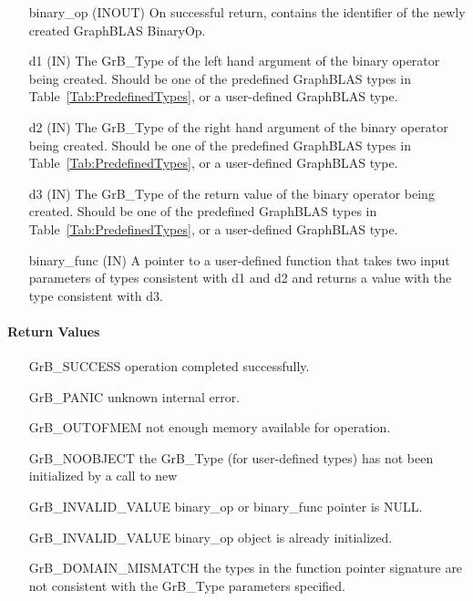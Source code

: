\begin{itemize}[leftmargin=1.1in]
    \item[{\sf binary\_op}] ({\sf INOUT}) On successful return, contains the 
          identifier of the newly created GraphBLAS BinaryOp.
    \item[{\sf d1}]  ({\sf IN}) The {\sf GrB\_Type} of the left hand 
          argument of the binary operator being created. Should be one of the
          predefined GraphBLAS types in Table~\ref{Tab:PredefinedTypes}, or a
          user-defined GraphBLAS type.
    \item[{\sf d2}]  ({\sf IN}) The {\sf GrB\_Type} of the right hand 
          argument of the binary operator being created. Should be one of the
          predefined GraphBLAS types in Table~\ref{Tab:PredefinedTypes}, or a 
          user-defined GraphBLAS type.
    \item[{\sf d3}]  ({\sf IN}) The {\sf GrB\_Type} of the return
          value of the binary operator being created. Should be one of the
          predefined GraphBLAS types in Table~\ref{Tab:PredefinedTypes}, or a 
          user-defined GraphBLAS type.
    \item[{\sf binary\_func}] ({\sf IN}) A pointer to a user-defined function that 
          takes two input parameters of types consistent with {\sf d1} and 
          {\sf d2} and returns a value with the type consistent with {\sf d3}. 
\end{itemize}


\paragraph{Return Values}

\begin{itemize}[leftmargin=2.1in]
\item[{\sf GrB\_SUCCESS}]           operation completed successfully.
\item[{\sf GrB\_PANIC}]             unknown internal error.
\item[{\sf GrB\_OUTOFMEM}]          not enough memory available for operation.
\item[{\sf GrB\_NOOBJECT}]          the {\sf GrB\_Type} (for user-defined types)
                                    has not been initialized by a call to {\sf new}
\item[{\sf GrB\_INVALID\_VALUE}]    {\sf binary\_op} or {\sf binary\_func} pointer is {\sf NULL}.
\item[{\sf GrB\_INVALID\_VALUE}]    {\sf binary\_op} object is already initialized.
\item[{\sf GrB\_DOMAIN\_MISMATCH}]  the types in the function pointer signature are not   
                                    consistent with the {\sf GrB\_Type} parameters specified.
\end{itemize}

